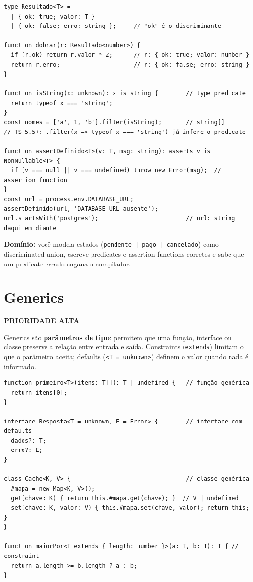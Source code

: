 \documentclass[12pt,a4paper,oneside]{book}
\newcommand{\alta}{\colorbox{red!15}{\sffamily\scriptsize\bfseries PRIORIDADE ALTA}}
\newcommand{\code}[1]{\texttt{#1}}
\newcommand{\dom}[1]{\begin{dominio}\textbf{Domínio:} #1\end{dominio}}
\begin{document}
\begin{verbatim}
type Resultado<T> =
  | { ok: true; valor: T }
  | { ok: false; erro: string };     // "ok" é o discriminante

function dobrar(r: Resultado<number>) {
  if (r.ok) return r.valor * 2;      // r: { ok: true; valor: number }
  return r.erro;                     // r: { ok: false; erro: string }
}

function isString(x: unknown): x is string {        // type predicate
  return typeof x === 'string';
}
const nomes = ['a', 1, 'b'].filter(isString);       // string[]
// TS 5.5+: .filter(x => typeof x === 'string') já infere o predicate

function assertDefinido<T>(v: T, msg: string): asserts v is NonNullable<T> {
  if (v === null || v === undefined) throw new Error(msg);  // assertion function
}
const url = process.env.DATABASE_URL;
assertDefinido(url, 'DATABASE_URL ausente');
url.startsWith('postgres');                         // url: string daqui em diante
\end{verbatim}

\dom{você modela estados (\code{pendente | pago | cancelado}) como discriminated union, escreve predicates e assertion functions corretos e sabe que um predicate errado engana o compilador.}

\section{Generics}
\label{sec:generics}
\alta

Generics são \textbf{parâmetros de tipo}: permitem que uma função, interface ou classe preserve a relação entre entrada e saída. Constraints (\code{extends}) limitam o que o parâmetro aceita; defaults (\code{<T = unknown>}) definem o valor quando nada é informado.

\begin{verbatim}
function primeiro<T>(itens: T[]): T | undefined {   // função genérica
  return itens[0];
}

interface Resposta<T = unknown, E = Error> {        // interface com defaults
  dados?: T;
  erro?: E;
}

class Cache<K, V> {                                 // classe genérica
  #mapa = new Map<K, V>();
  get(chave: K) { return this.#mapa.get(chave); }  // V | undefined
  set(chave: K, valor: V) { this.#mapa.set(chave, valor); return this; }
}

function maiorPor<T extends { length: number }>(a: T, b: T): T { // constraint
  return a.length >= b.length ? a : b;
}
\end{verbatim}
\end{document}
